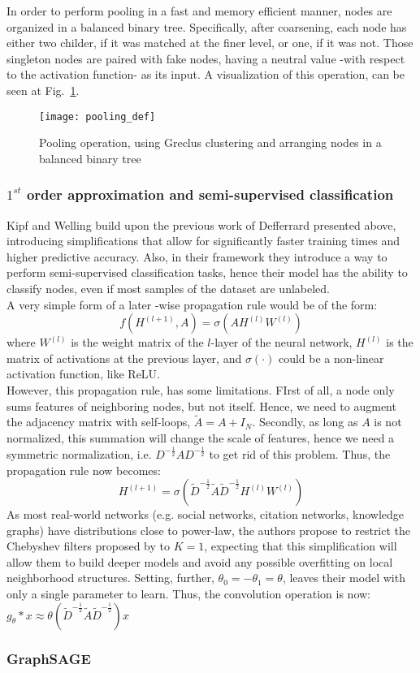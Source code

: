 In order to perform pooling in a fast and memory efficient manner, nodes are
organized in a balanced binary tree. Specifically, after coarsening, each node
has either two childer, if it was matched at the finer level, or one, if it was
not. Those singleton nodes are paired with fake nodes, having a neutral value
-with respect to the activation function- as its input. A visualization of  this
operation, can be seen at Fig.~\ref{pooldef}.
\begin{figure}
\texttt{[image: pooling\_def]}
\caption{Pooling operation, using Greclus clustering and arranging nodes in a balanced binary tree}
\label{pooldef}
\end{figure}
\subsubsection*{$1^{st}$ order approximation and semi-supervised classification}
Kipf and Welling \cite{kipf} build upon the previous work of Defferrard
presented above, introducing simplifications that allow for significantly faster training
times and higher predictive accuracy. Also, in their framework they introduce a
way to perform semi-supervised classification tasks, hence their model has the
ability to classify nodes, even if most samples of the dataset are unlabeled.\\
A very simple form of a later -wise propagation rule would be of the form:
\begin{equation*}
f(H^{(l+1)},A) = \sigma(AH^{(l)}W^{(l)})
\end{equation*}
where $W^{(l)}$ is the weight matrix of the $l$-layer of the neural network,
$H^{(l)}$ is the matrix of activations at the previous layer, and $\sigma(\cdot
)$ could be  a non-linear activation function, like ReLU.\\
However, this propagation rule, has some limitations. FIrst of all, a node only
sums features of neighboring nodes, but not itself. Hence, we need to augment
the adjacency matrix with self-loops, $\widetilde{A} = A + I_N$. Secondly, as
long as $A$ is not normalized, this summation will change the scale of features,
hence we need a symmetric normalization, i.e.
$D^{-\frac{1}{2}}AD^{-\frac{1}{2}}$ to get rid of this problem. Thus, the
propagation rule now becomes:\\
\begin{equation}
H^{(l+1)} =
\sigma(\widetilde{D}^{-\frac{1}{2}}\widetilde{A}\widetilde{D}^{-\frac{1}{2}}H^{(l)}W^{(l)})
\end{equation}
As most real-world networks (e.g. social networks, citation networks, knowledge
graphs) have distributions close to power-law, the authors propose to restrict
the Chebyshev filters proposed by \cite{mddef} to $K=1$, expecting that this
simplification will allow them to build deeper models and avoid any possible
overfitting on local neighborhood structures. Setting, further, $\theta_0 =
-\theta_1 = \theta$, leaves their model with only a single parameter to learn.
Thus, the convolution operation is now:\\
$g_\theta * x \approx \theta (\widetilde{D}^{-\frac{1}{2}}\widetilde{A}\widetilde{D}^{-\frac{1}{2}})
x$
\subsubsection*{GraphSAGE}
